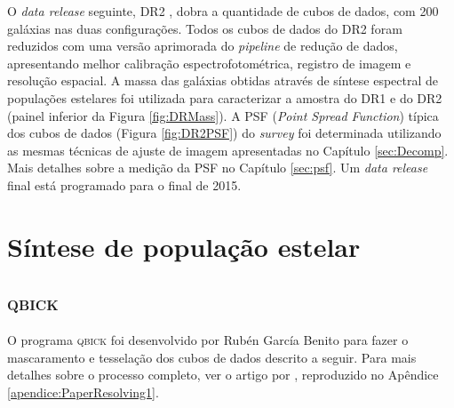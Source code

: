 O {\em data release} seguinte, DR2 \citep{GarciaBenito2015}, dobra a quantidade
de cubos de dados, com 200 galáxias nas duas configurações. Todos os cubos de
dados do DR2 foram reduzidos com uma versão aprimorada do {\em pipeline} de
redução de dados, apresentando melhor calibração espectrofotométrica, registro
de imagem e resolução espacial. A massa das galáxias obtidas através de síntese
espectral de populações estelares foi utilizada para caracterizar a amostra do
DR1 e do DR2 (painel inferior da Figura \ref{fig:DRMass}).
A PSF ({\em Point Spread Function}) típica dos cubos de dados (Figura
\ref{fig:DR2PSF}) do {\em survey} foi determinada utilizando as mesmas técnicas
de ajuste de imagem apresentadas no Capítulo \ref{sec:Decomp}. Mais detalhes
sobre a medição da PSF no Capítulo \ref{sec:psf}. Um {\em data release} final
está programado para o final de 2015.


\section{Síntese de população estelar}
\label{sec:ifs:sintese}


\subsection{\textsc{qbick}}
\label{sec:ifs:qbick}

O programa \textsc{qbick} foi desenvolvido por Rubén García Benito para fazer o
mascaramento e tesselação dos cubos de dados descrito a seguir. Para mais
detalhes sobre o processo completo, ver o artigo por \citet{CidFernandes2013},
reproduzido no Apêndice \ref{apendice:PaperResolving1}.


